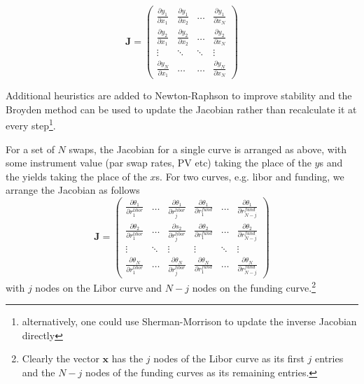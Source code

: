 \begin{equation*}
\mathbf{J} = \left(  
\begin{array}{cccc}
\frac{\partial y_{1}}{\partial x_1} & \frac{\partial y_1}{\partial x_2} & \ldots & \frac{\partial y_1}{\partial x_N}\\
\frac{\partial y_2}{\partial x_1}&\frac{\partial y_2}{\partial x_2} &\ldots&\frac{\partial y_2}{\partial x_N}\\
\vdots&\ddots&\ddots&\vdots\\
\frac{\partial y_N}{\partial x_1}&\ldots&\ldots&\frac{\partial y_N}{\partial x_N}
\end{array}
\right)
\end{equation*}

Additional heuristics are added to Newton-Raphson to improve stability  and the Broyden method can be used to update the Jacobian rather than recalculate it at every step\footnote{alternatively, one could use Sherman-Morrison to update the inverse Jacobian directly}.

For a set of $N$ swaps, the Jacobian for a single curve is arranged as above, with some instrument value (par swap rates, PV etc) taking the place of the $y$s and the yields taking the place of the $x$s.  For two curves, e.g.  libor and funding, we arrange the Jacobian as follows 
%
\begin{equation}
\mathbf{J} = \left(  
\begin{array}{cccccc}
\frac{\partial \theta_{1}}{\partial r^{libor}_1} & \ldots & \frac{\partial  \theta_1}{\partial r^{libor}_j} &  \frac{\partial  \theta_1}{\partial r^{fund}_1} &\ldots & \frac{\partial  \theta_1}{\partial r^{fund}_{N-j}}\\
\frac{\partial  \theta_{2}}{\partial r^{libor}_1} & \ldots & \frac{\partial s_2}{\partial r^{libor}_j} &  \frac{\partial  \theta_2}{\partial r^{fund}_1} &\ldots & \frac{\partial  \theta_2}{\partial r^{fund}_{N-j}}\\
\vdots & \ddots & \vdots & \vdots & \ddots  &\vdots\\
\frac{\partial  \theta_{N}}{\partial r^{libor}_1} & \ldots & \frac{\partial  \theta_N}{\partial r^{libor}_j} &  \frac{\partial  \theta_N}{\partial r^{fund}_1} &\ldots & \frac{\partial  \theta_N}{\partial r^{fund}_{N-j}}
\end{array}
\right)
\end{equation}
%
with $j$ nodes on the Libor curve and $N-j$ nodes on the funding curve.\footnote{Clearly the vector $\mathbf{x}$ has the $j$ nodes of the Libor curve as its first $j$ entries and the $N-j$ nodes of the funding curves as its remaining entries.} 

